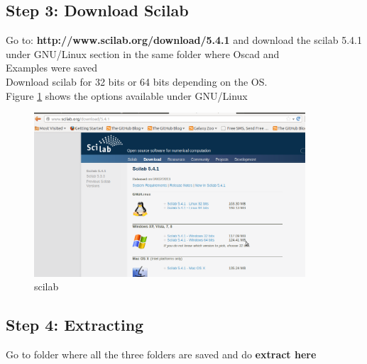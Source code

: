 \subsection {Step 3: Download Scilab }
Go to: \textbf{http://www.scilab.org/download/5.4.1} and download the scilab 5.4.1 under GNU/Linux section in the same folder where Oscad and \\
Examples were saved\\
Download scilab for 32 bits or 64 bits depending on the OS.\\
Figure \ref{scilab}  shows the options available under GNU/Linux
\begin{figure}[h!]
\centering
\includegraphics[width=0.9\textwidth]{figures/scilab.png}
\caption{scilab}
\label{scilab}
\end{figure}
\subsection {Step 4: Extracting }
Go to folder where all the three folders are saved and do \textbf{extract here} 

